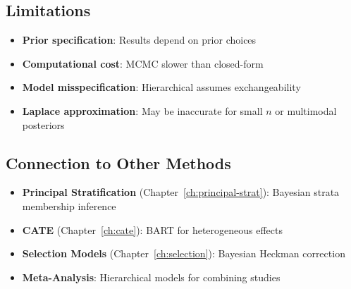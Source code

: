 \subsection{Limitations}

\begin{itemize}
\item \textbf{Prior specification}: Results depend on prior choices
\item \textbf{Computational cost}: MCMC slower than closed-form
\item \textbf{Model misspecification}: Hierarchical assumes exchangeability
\item \textbf{Laplace approximation}: May be inaccurate for small $n$ or multimodal posteriors
\end{itemize}

\subsection{Connection to Other Methods}

\begin{itemize}
\item \textbf{Principal Stratification} (Chapter~\ref{ch:principal-strat}): Bayesian strata membership inference
\item \textbf{CATE} (Chapter~\ref{ch:cate}): BART for heterogeneous effects
\item \textbf{Selection Models} (Chapter~\ref{ch:selection}): Bayesian Heckman correction
\item \textbf{Meta-Analysis}: Hierarchical models for combining studies
\end{itemize}

